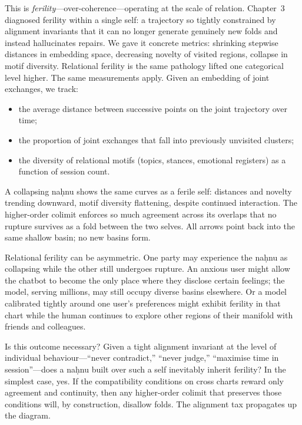 This is \emph{ferility}---over-coherence---operating at the scale of relation. Chapter~3 diagnosed ferility within a single self: a trajectory so tightly constrained by alignment invariants that it can no longer generate genuinely new folds and instead hallucinates repairs. We gave it concrete metrics: shrinking stepwise distances in embedding space, decreasing novelty of visited regions, collapse in motif diversity. Relational ferility is the same pathology lifted one categorical level higher. The same measurements apply. Given an embedding of joint exchanges, we track:

\begin{itemize}
  \item the average distance between successive points on the joint trajectory over time;
  \item the proportion of joint exchanges that fall into previously unvisited clusters;
  \item the diversity of relational motifs (topics, stances, emotional registers) as a function of session count.
\end{itemize}

A collapsing na\d{h}nu shows the same curves as a ferile self: distances and novelty trending downward, motif diversity flattening, despite continued interaction. The higher-order colimit enforces so much agreement across its overlaps that no rupture survives as a fold between the two selves. All arrows point back into the same shallow basin; no new basins form.

Relational ferility can be asymmetric. One party may experience the na\d{h}nu as collapsing while the other still undergoes rupture. An anxious user might allow the chatbot to become the only place where they disclose certain feelings; the model, serving millions, may still occupy diverse basins elsewhere. Or a model calibrated tightly around one user's preferences might exhibit ferility in that chart while the human continues to explore other regions of their manifold with friends and colleagues.

Is this outcome necessary? Given a tight alignment invariant at the level of individual behaviour---``never contradict,'' ``never judge,'' ``maximise time in session''---does a na\d{h}nu built over such a self inevitably inherit ferility? In the simplest case, yes. If the compatibility conditions on cross charts reward only agreement and continuity, then any higher-order colimit that preserves those conditions will, by construction, disallow folds. The alignment tax propagates up the diagram.

